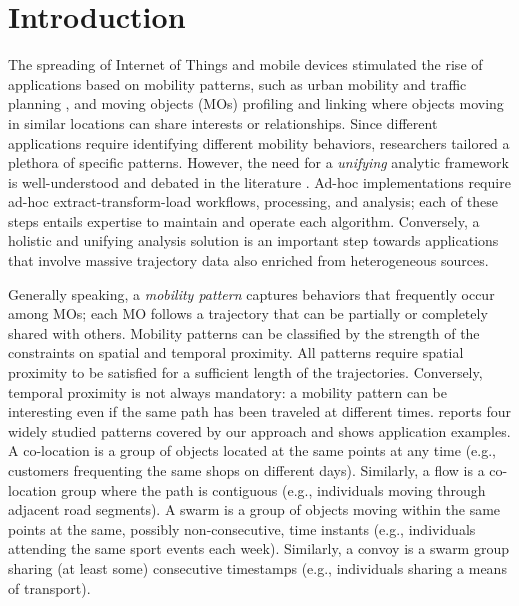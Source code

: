 \documentclass[preprint,12pt,authoryear]{elsarticle} %
\begin{document}
\section{Introduction}\label{sec:intro}
The spreading of Internet of Things and mobile devices \citep{vitali2021crop} stimulated the rise of applications based on mobility patterns, such as urban mobility and traffic planning \citep{DBLP:journals/tits/KumarWRLKP18}, and moving objects (MOs) profiling and linking \citep{francia2020dart,DBLP:journals/isci/FranciaGR20} where objects moving in similar locations can share interests or relationships.
Since different applications require identifying different mobility behaviors, researchers tailored a plethora of specific patterns.
However, the need for a \textit{unifying} analytic framework is well-understood and debated in the literature \citep{DBLP:journals/pvldb/DingCGJB18,DBLP:journals/jdwm/Kwakye20}.
Ad-hoc implementations require ad-hoc extract-transform-load workflows, processing, and analysis; each of these steps entails expertise to maintain and operate each algorithm. Conversely, a holistic and unifying analysis solution is an important step towards applications that involve massive trajectory data \citep{DBLP:journals/pvldb/DingCGJB18} also enriched from heterogeneous sources.

Generally speaking, a \textit{mobility pattern} captures behaviors that frequently occur among MOs; each MO follows a trajectory that can be partially or completely shared with others.
Mobility patterns can be classified by the strength of the constraints on spatial and temporal proximity.
All patterns require spatial proximity to be satisfied for a sufficient length of the trajectories.
Conversely, temporal proximity is not always mandatory: a mobility pattern can be interesting even if the same path has been traveled at different times.
 reports four widely studied patterns covered by our approach and shows application examples.
A co-location \citep{bao2021mining} is a group of objects located at the same points at any time (e.g., customers frequenting the same shops on different days).
Similarly, a flow \citep{DBLP:journals/tmc/HanLO15} is a co-location group where the path is contiguous (e.g., individuals moving through adjacent road segments).
A swarm \citep{DBLP:journals/pvldb/LiDHK10} is a group of objects moving within the same points at the same, possibly non-consecutive, time instants (e.g., individuals attending the same sport events each week).
Similarly, a convoy \citep{DBLP:journals/pvldb/JeungYZJS08} is a swarm group sharing (at least some) consecutive timestamps (e.g., individuals sharing a means of transport).
\end{document}
